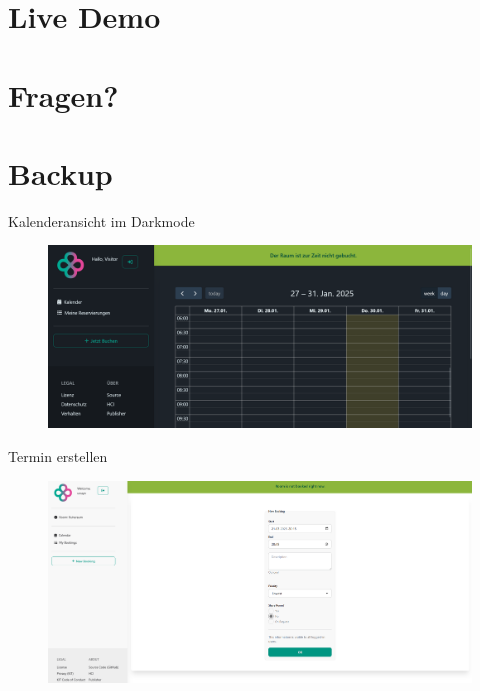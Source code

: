 \section{Live Demo}

\section{Fragen?}

\section{Backup}
\begin{frame}{Kalenderansicht im Darkmode}
    \thispagestyle{plain}
    \begin{figure}
        \centering
        \includegraphics[width=1\linewidth]{pictures/calendar_dark.png}
        \label{fig:enter-label}
    \end{figure}
\end{frame}

\begin{frame}{Termin erstellen}
    \thispagestyle{plain}
    \begin{figure}
        \centering
        \includegraphics[width=1\linewidth]{pictures/bookings_create.png}
        \label{fig:enter-label}
    \end{figure}
\end{frame}

